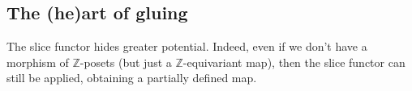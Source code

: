 %
%
%
%
%
%

\subsection{The (he)art of gluing} The slice functor hides greater potential. Indeed, even if we don't have a morphism of $\mathbb{Z}$-posets (but just a $\mathbb{Z}$-equivariant map), then the slice functor can still be applied, obtaining a partially defined map. \\

